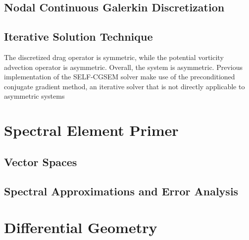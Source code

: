 \documentclass{softwaremanual}
\begin{document}
\section{Nodal Continuous Galerkin Discretization}


\section{Iterative Solution Technique}
The discretized drag operator is symmetric, while the potential vorticity advection operator is asymmetric. Overall, the system is asymmetric. Previous implementation of the SELF-CGSEM solver make use of the preconditioned conjugate gradient method, an iterative solver that is not directly applicable to asymmetric systems

\clearpage

\appendix

\chapter{Spectral Element Primer}

\section{Vector Spaces}


\section{Spectral Approximations and Error Analysis}

\chapter{Differential Geometry}\label{chap:GeometryTheory}

\pagebreak



\end{document}
